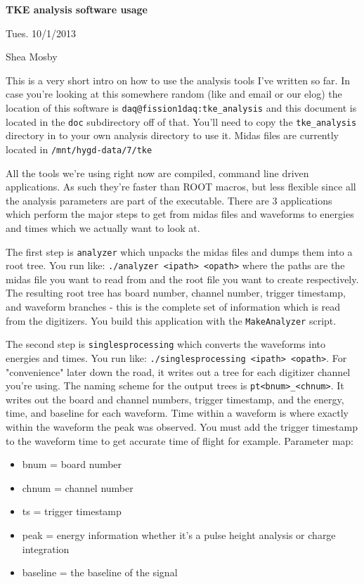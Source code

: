 \documentclass[10pt]{article}
\begin{document}
    \begin{center}
        \textbf{\LARGE{TKE analysis software usage}}

        \large{Tues. 10/1/2013}

        \large{Shea Mosby}
    \end{center}

This is a very short intro on how to use the analysis tools I've written so far. In case you're looking at this somewhere random (like and email or our elog) the location of this software is \verb#daq@fission1daq:tke_analysis# and this document is located in the \verb#doc# subdirectory off of that. You'll need to copy the \verb#tke_analysis# directory in to your own analysis directory to use it. Midas files are currently located in \verb#/mnt/hygd-data/7/tke#

All the tools we're using right now are compiled, command line driven applications. As such they're faster than ROOT macros, but less flexible since all the analysis parameters are part of the executable. There are 3 applications which perform the major steps to get from midas files and waveforms to energies and times which we actually want to look at.

The first step is \verb#analyzer# which unpacks the midas files and dumps them into a root tree. You run like: \verb#./analyzer <ipath> <opath># where the paths are the midas file you want to read from and the root file you want to create respectively. The resulting root tree has board number, channel number, trigger timestamp, and waveform branches - this is the complete set of information which is read from the digitizers. You build this application with the \verb#MakeAnalyzer# script.


The second step is \verb#singlesprocessing# which converts the waveforms into energies and times. You run like: \verb#./singlesprocessing <ipath> <opath>#. For "convenience" later down the road, it writes out a tree for each digitizer channel you're using. The naming scheme for the output trees is \verb#pt<bnum>_<chnum>#. It writes out the board and channel numbers, trigger timestamp, and the energy, time, and baseline for each waveform. Time within a waveform is where exactly within the waveform the peak was observed. You must add the trigger timestamp to the waveform time to get accurate time of flight for example. Parameter map:

\begin{itemize}
\item bnum = board number
\item chnum = channel number
\item ts = trigger timestamp
\item peak = energy information whether it's a pulse height analysis or charge integration
\item baseline = the baseline of the signal
\end{itemize}
\end{document}
